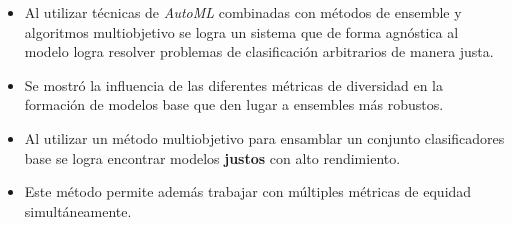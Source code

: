 \begin{conclusions}
\begin{itemize}
    \item Al utilizar técnicas de \emph{AutoML} combinadas con métodos de ensemble y algoritmos multiobjetivo se logra un sistema que de forma agnóstica al modelo logra resolver problemas de clasificación arbitrarios de manera justa.
    \item Se mostró la influencia de las diferentes métricas de diversidad en la formación de modelos base que den lugar a ensembles más robustos.
    \item Al utilizar un método multiobjetivo para ensamblar un conjunto clasificadores base se logra encontrar modelos \textbf{justos} con alto rendimiento.
    \item Este método permite además trabajar con múltiples métricas de equidad simultáneamente.
\end{itemize}

\end{conclusions}

